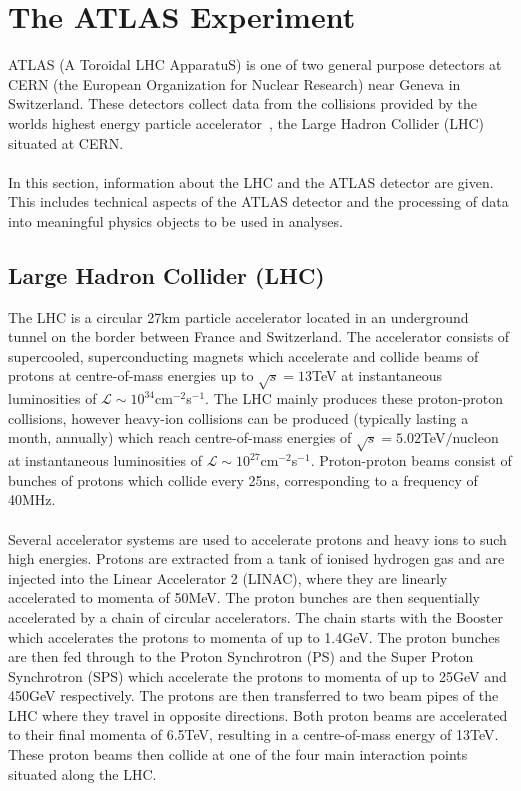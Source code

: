 \section{The ATLAS Experiment}
ATLAS (A Toroidal LHC ApparatuS) is one of two general purpose detectors at CERN (the European Organization for Nuclear Research) near Geneva in Switzerland. These detectors collect data from the collisions provided by the worlds highest energy particle accelerator~\cite{lhc-design-report}, the Large Hadron Collider (LHC) situated at CERN. \\\\
In this section, information about the LHC and the ATLAS detector are given. This includes technical aspects of the ATLAS detector and the processing of data into meaningful physics objects to be used in analyses.

\subsection{Large Hadron Collider (LHC)}
The LHC is a circular 27km particle accelerator located in an underground tunnel on the border between France and Switzerland. The accelerator consists of supercooled, superconducting magnets which accelerate and collide beams of protons at centre-of-mass energies up to $\sqrt{s} = 13$TeV at instantaneous luminosities of $\mathcal{L} \sim 10^{34}$cm$^{-2}$s$^{-1}$. The LHC mainly produces these proton-proton collisions, however heavy-ion collisions can be produced (typically lasting a month, annually) which reach centre-of-mass energies of $\sqrt{s} = 5.02$TeV$/$nucleon at instantaneous luminosities of $\mathcal{L} \sim 10^{27}$cm$^{-2}$s$^{-1}$. Proton-proton beams consist of bunches of protons which collide every 25ns, corresponding to a frequency of 40MHz. \\\\ 
Several accelerator systems are used to accelerate protons and heavy ions to such high energies. Protons are extracted from a tank of ionised hydrogen gas and are injected into the Linear Accelerator 2 (LINAC), where they are linearly accelerated to momenta of 50MeV. The proton bunches are then sequentially accelerated by a chain of circular accelerators. The chain starts with the Booster which accelerates the protons to momenta of up to 1.4GeV. The proton bunches are then fed through to the Proton Synchrotron (PS) and the Super Proton Synchrotron (SPS) which accelerate the protons to momenta of up to 25GeV and 450GeV respectively. The protons are then transferred to two beam pipes of the LHC where they travel in opposite directions. Both proton beams are accelerated to their final momenta of 6.5TeV, resulting in a centre-of-mass energy of 13TeV. These proton beams then collide at one of the four main interaction points situated along the LHC. \\\\

